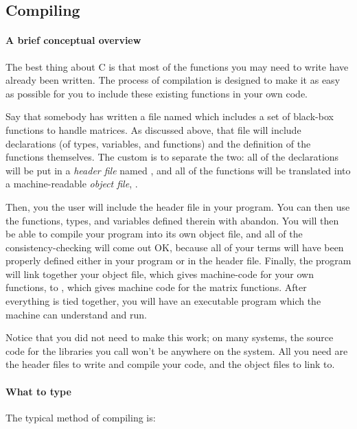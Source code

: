 \documentclass[12pt]{article}
\def\ind#1{\index{#1}#1}
\begin{document}
\subsection{Compiling}	 

\paragraph{A brief conceptual overview} The best thing about C is that most
of the functions you may need to write have already been written. The
process of compilation is designed to make it as easy as possible for
you to include these existing functions in your own code.

Say that somebody has written a file named  which
includes a set of black-box functions to handle matrices.
As discussed above,
that file will include declarations (of types, variables, and functions)
and the definition of the functions themselves. The custom is to separate
the two: all of the declarations will be put in a {\sl \ind{header file}}
named , and all of the functions will be translated
into a machine-readable {\sl \ind{object file}}, .

Then, you the user will include the header file in your program. You can then
use the functions, types, and variables defined therein with abandon.
You will then be able to compile your program into its own object file,
and all of the consistency-checking will come out OK, because all of your
terms will have been properly defined either in your program or in the
header file. Finally, the program will link together your object file,
which gives machine-code for your own functions, to ,
which gives machine code for the matrix functions. After everything is
tied together, you will have an executable program which the machine can
understand and run.

Notice that you did not need  to make this work;
on many systems, the source code for the libraries you call
won't be anywhere on the system. All you need are the 
header files to write and compile your code, and the
object files to link to.



\paragraph{What to type}
The typical method of compiling is:
\end{document}
